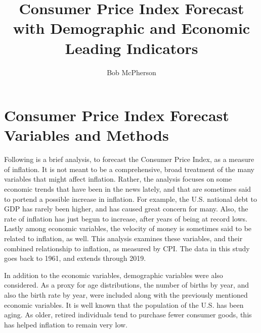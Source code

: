 \documentclass[12pt]{article}         %
\title{Consumer Price Index Forecast with Demographic and Economic Leading Indicators}  %
\author{Bob McPherson}          %
\begin{document}




\maketitle              %

\section{Consumer Price Index Forecast Variables and Methods}

Following is a brief analysis, to forecast the Consumer Price Index, as a measure of inflation.  It is not meant to be a comprehensive, broad treatment of the many variables that might affect inflation.  Rather, the analysis focuses on some economic trends that have been in the news lately, and that are sometimes said to portend a possible increase in inflation.  For example, the U.S. national debt to GDP has rarely been higher, and has caused great concern for many.  Also, the rate of inflation has just begun to increase, after years of being at record lows.  Lastly among economic variables, the velocity of money is sometimes said to be related to inflation, as well.  This analysis examines these variables, and their combined relationship to inflation, as measured by CPI.  The data in this study goes back to 1961, and extends through 2019.

In addition to the economic variables, demographic variables were also considered.  As a proxy for age distributions, the number of births by year, and also the birth rate by year, were included along with the previously mentioned economic variables.  It is well known that the population of the U.S. has been aging.  As older, retired individuals tend to purchase fewer consumer goods, this has helped inflation to remain very low.  
\end{document}
